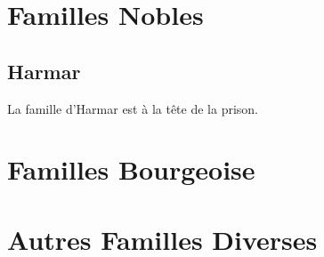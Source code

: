\section{Familles Nobles}

\subsection*{Harmar}
La famille d'Harmar est à la tête de la prison.

\section{Familles Bourgeoise}

\section{Autres Familles Diverses}

